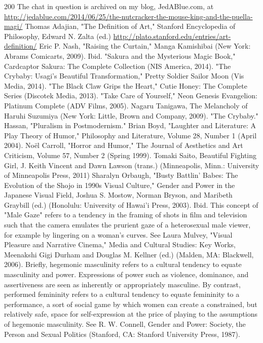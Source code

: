 \begin{thebibliography}{200}
    The chat in question is archived on my blog, JedABlue.com, at  \url{http://jedablue.com/2014/06/25/the-nutcracker-the-mouse-king-and-the-puella-magi/}
    Thomas Adajian, "The Definition of Art," Stanford Encyclopedia of Philosophy, Edward N. Zalta (ed.) \url{http://plato.stanford.edu/entries/art-definition/}
    Eric P. Nash, "Raising the Curtain," Manga Kamishibai (New York: Abrams Comicarts, 2009).
    Ibid.
    "Sakura and the Mysterious Magic Book," Cardcaptor Sakura: The Complete Collection (NIS America, 2014).
    "The Crybaby: Usagi's Beautiful Transformation," Pretty Soldier Sailor Moon (Vis Media, 2014).
    "The Black Claw Grips the Heart," Cutie Honey: The Complete Series (Discotek Media, 2013).
    "Take Care of Yourself," Neon Genesis Evangelion: Platinum Complete (ADV Films, 2005).
    Nagaru Tanigawa, The Melancholy of Haruhi Suzumiya (New York: Little, Brown and Company, 2009).
    "The Crybaby."
    Hassan, "Pluralism in Postmodernism."
    Brian Boyd, "Laughter and Literature: A Play Theory of Humor," Philosophy and Literature, Volume 28, Number 1 (April 2004).
    Noël Carroll, "Horror and Humor," The Journal of Aesthetics and Art Criticism, Volume 57, Number 2 (Spring 1999).
    Tomaki Saito, Beautiful Fighting Girl, J. Keith Vincent and Dawn Lawson (trans.) (Minneapolis, Minn.: University of Minneapolis Press, 2011)
    Sharalyn Orbaugh, "Busty Battlin' Babes: The Evolution of the Shojo in 1990s Visual Culture," Gender and Power in the Japanese Visual Field, Joshua S. Mostow, Norman Bryson, and Maribeth Graybill (ed.) (Honolulu: University of Hawai'i Press, 2003).
    Ibid. This concept of "Male Gaze" refers to a tendency in the framing of shots in film and television such that the camera emulates the prurient gaze of a heterosexual male viewer, for example by lingering on a woman's curves. See Laura Mulvey, "Visual Pleasure and Narrative Cinema," Media and Cultural Studies: Key Works, Meenakshi Gigi Durham and Douglas M. Kellner (ed.) (Malden, MA: Blackwell, 2006).
    Briefly, hegemonic masculinity refers to a cultural tendency to equate masculinity and power. Expressions of power such as violence, dominance, and assertiveness are seen as inherently or appropriately masculine. By contrast, performed femininity refers to a cultural tendency to equate femininity to a performance, a sort of social game by which women can create a constrained, but relatively safe, space for self-expression at the price of playing to the assumptions of hegemonic masculinity. See R. W. Connell, Gender and Power: Society, the Person and Sexual Politics (Stanford, CA: Stanford University Press, 1987).

\end{thebibliography}

